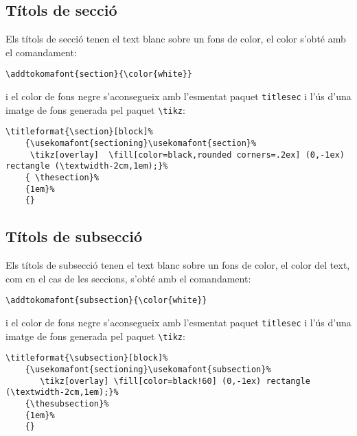 \documentclass[a4paper,%
                             twoside,%
                             BCOR1.0cm,%
                             DIV11,%
                             parskip=full,%
                             11pt]{scrbook}
\begin{document}
\subsection{Títols de secció}\label{sbsec:titsec}
Els títols de secció tenen el text blanc sobre un fons de color, el color s'obté amb el comandament:
\begin{scriptsize}
\begin{verbatim}
\addtokomafont{section}{\color{white}}
\end{verbatim}
\end{scriptsize}
i el color de fons negre s'aconsegueix amb l'esmentat paquet \verb+titlesec+ i l'ús d'una imatge de fons generada pel paquet \verb+\tikz+:
\begin{tiny}
\begin{verbatim}
\titleformat{\section}[block]%              
    {\usekomafont{sectioning}\usekomafont{section}% 
     \tikz[overlay]  \fill[color=black,rounded corners=.2ex] (0,-1ex) rectangle (\textwidth-2cm,1em);}%  
    { \thesection}%                   
    {1em}%
    {}
\end{verbatim}
\end{tiny}


\subsection{Títols de subsecció}\label{sbsec:titsubsec}
Els títols de subsecció tenen el text blanc sobre un fons de color, el color del text, com en el cas de les seccions,  s'obté amb el comandament:
\begin{scriptsize}
\begin{verbatim}
\addtokomafont{subsection}{\color{white}}
\end{verbatim}
\end{scriptsize}
i el color de fons negre s'aconsegueix amb l'esmentat paquet \verb+titlesec+ i l'ús d'una imatge de fons generada pel paquet \verb+\tikz+:
\begin{tiny}
\begin{verbatim}
\titleformat{\subsection}[block]%              
    {\usekomafont{sectioning}\usekomafont{subsection}% 
       \tikz[overlay] \fill[color=black!60] (0,-1ex) rectangle (\textwidth-2cm,1em);}%  
    {\thesubsection}%                   
    {1em}%
    {}
\end{verbatim}
\end{tiny}
\end{document}
